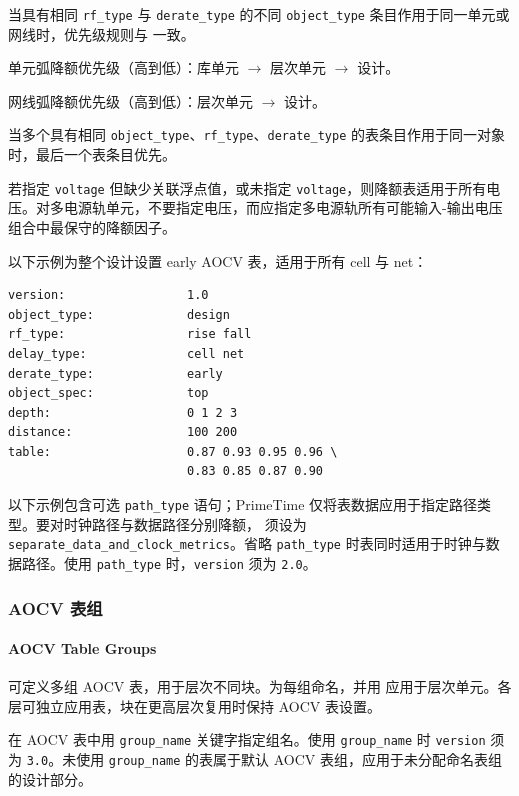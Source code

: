 当具有相同 \texttt{rf\_type} 与 \texttt{derate\_type} 的不同 \texttt{object\_type} 条目作用于同一单元或网线时，优先级规则与  一致。

单元弧降额优先级（高到低）：库单元 $\rightarrow$ 层次单元 $\rightarrow$ 设计。

网线弧降额优先级（高到低）：层次单元 $\rightarrow$ 设计。

\begin{noteBox}
当多个具有相同 \texttt{object\_type}、\texttt{rf\_type}、\texttt{derate\_type} 的表条目作用于同一对象时，最后一个表条目优先。
\end{noteBox}

若指定 \texttt{voltage} 但缺少关联浮点值，或未指定 \texttt{voltage}，则降额表适用于所有电压。对多电源轨单元，不要指定电压，而应指定多电源轨所有可能输入-输出电压组合中最保守的降额因子。

以下示例为整个设计设置 early AOCV 表，适用于所有 cell 与 net：
\begin{lstlisting}
version:                 1.0
object_type:             design
rf_type:                 rise fall
delay_type:              cell net
derate_type:             early
object_spec:             top
depth:                   0 1 2 3
distance:                100 200
table:                   0.87 0.93 0.95 0.96 \
                         0.83 0.85 0.87 0.90
\end{lstlisting}

以下示例包含可选 \texttt{path\_type} 语句；PrimeTime 仅将表数据应用于指定路径类型。要对时钟路径与数据路径分别降额， 须设为 \texttt{separate\_data\_and\_clock\_metrics}。省略 \texttt{path\_type} 时表同时适用于时钟与数据路径。使用 \texttt{path\_type} 时，\texttt{version} 须为 \texttt{2.0}。

\subsubsection{AOCV 表组}
\paragraph*{AOCV Table Groups}

可定义多组 AOCV 表，用于层次不同块。为每组命名，并用  应用于层次单元。各层可独立应用表，块在更高层次复用时保持 AOCV 表设置。

在 AOCV 表中用 \texttt{group\_name} 关键字指定组名。使用 \texttt{group\_name} 时 \texttt{version} 须为 \texttt{3.0}。未使用 \texttt{group\_name} 的表属于默认 AOCV 表组，应用于未分配命名表组的设计部分。

